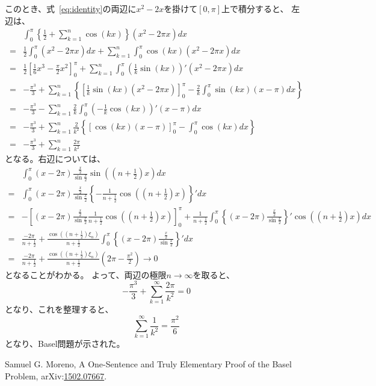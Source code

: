 \documentclass{jsarticle}
\begin{document}
このとき、式~\eqref{eq:identity}の両辺に$x^{2}-2x$を掛けて$[0,\pi]$上で積分すると、
左辺は、
\begin{align}
	&\int_{0}^{\pi}\left\{\frac{1}{2}+\sum_{k=1}^{n}\cos(kx)\right\}(x^{2}-2\pi x)dx\\
	=&\frac{1}{2}\int_{0}^{\pi}(x^{2}-2\pi x)dx+\sum_{k=1}^{n}\int_{0}^{\pi}\cos(kx)(x^2-2\pi x)dx\\
	=&\frac{1}{2}\left[\frac{1}{6}x^{3}-\frac{\pi}{2}x^{2}\right]_{0}^{\pi}
	+\sum_{k=1}^{n}\int_{0}^{\pi}\left(\frac{1}{k}\sin(kx)\right)'(x^{2}-2\pi x)dx\\
	=&-\frac{\pi^{3}}{3}
	+\sum_{k=1}^{n}\left\{\left[\frac{1}{k}\sin(kx)(x^2-2\pi x)\right]_{0}^{\pi}
	-\frac{2}{k}\int_{0}^{\pi}\sin(kx)(x-\pi)dx\right\}\\
	=&-\frac{\pi^{3}}{3}
	-\sum_{k=1}^{n}\frac{2}{k}\int_{0}^{\pi}\left(-\frac{1}{k}\cos(kx)\right)'(x-\pi)dx\\
	=&-\frac{\pi^{3}}{3}+\sum_{k=1}^{n}\frac{2}{k^{2}}
	\left\{\left[\cos(kx)(x-\pi)\right]_{0}^{\pi}
	-\int_{0}^{\pi}\cos(kx)dx
	\right\}\\
	=&-\frac{\pi^{3}}{3}+\sum_{k=1}^{n}\frac{2\pi}{k^{2}}
\end{align}
となる。右辺については、
\begin{align}
	&\int_{0}^{\pi}(x-2\pi)\frac{\frac{x}{2}}{\sin\frac{x}{2}}\sin\left(\left(n+\frac{1}{2}\right)x\right)dx\\
	=&\int_{0}^{\pi}(x-2\pi)\frac{\frac{x}{2}}{\sin\frac{x}{2}}\left\{-\frac{1}{n+\frac{1}{2}}\cos\left(\left(n+\frac{1}{2}\right)x\right)\right\}'dx\\
	=&-\left[(x-2\pi)\frac{\frac{x}{2}}{\sin\frac{x}{2}}\frac{1}{n+\frac{1}{2}}\cos\left(\left(n+\frac{1}{2}\right)x\right)\right]_{0}^{\pi}
	+\frac{1}{n+\frac{1}{2}}\int_{0}^{\pi}\left\{(x-2\pi)\frac{\frac{x}{2}}{\sin\frac{x}{2}}\right\}'\cos\left(\left(n+\frac{1}{2}\right)x\right)dx\\
	=&\frac{-2\pi}{n+\frac{1}{2}}
	+\frac{\cos\left(\left(n+\frac{1}{2}\right)\xi_{n}\right)}{n+\frac{1}{2}}
	\int_{0}^{\pi}\left\{(x-2\pi)\frac{\frac{x}{2}}{\sin\frac{x}{2}}\right\}'dx\\
	=&\frac{-2\pi}{n+\frac{1}{2}}
	+\frac{\cos\left(\left(n+\frac{1}{2}\right)\xi_{n}\right)}{n+\frac{1}{2}}\left(2\pi-\frac{\pi^{2}}{2}\right)\to0
\end{align}
となることがわかる。
よって、両辺の極限$n\to\infty$を取ると、
\begin{equation}
	-\frac{\pi^{3}}{3}+\sum_{k=1}^{\infty}\frac{2\pi}{k^{2}}=0
\end{equation}
となり、これを整理すると、
\begin{equation}
	\sum_{k=1}^{\infty}\frac{1}{k^{2}}=\frac{\pi^{2}}{6}
\end{equation}
となり、Basel問題が示された。


\begin{thebibliography}{9}
	Samuel G. Moreno,
	A One-Sentence and Truly Elementary Proof of the Basel Problem,
	arXiv:\href{https://arxiv.org/abs/1502.07667}{1502.07667}.
\end{thebibliography}
\end{document}
